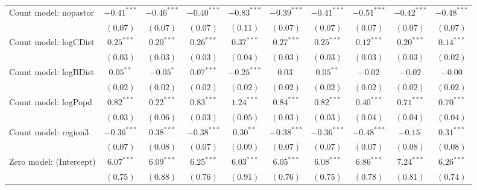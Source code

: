 \begin{sidewaystable}
\begin{center}
{\begin{tabular}{l c c c c c c c c c}
Count model: nopastor          & $-0.41^{***}$  & $-0.46^{***}$ & $-0.40^{***}$  & $-0.83^{***}$   & $-0.39^{***}$  & $-0.41^{***}$  & $-0.51^{***}$   & $-0.42^{***}$   & $-0.48^{***}$  \\
                               & $(0.07)$       & $(0.07)$      & $(0.07)$       & $(0.11)$        & $(0.07)$       & $(0.07)$       & $(0.07)$        & $(0.07)$        & $(0.07)$       \\
Count model: logCDist          & $0.25^{***}$   & $0.20^{***}$  & $0.26^{***}$   & $0.37^{***}$    & $0.27^{***}$   & $0.25^{***}$   & $0.12^{***}$    & $0.20^{***}$    & $0.14^{***}$   \\
                               & $(0.03)$       & $(0.03)$      & $(0.03)$       & $(0.04)$        & $(0.03)$       & $(0.03)$       & $(0.03)$        & $(0.03)$        & $(0.02)$       \\
Count model: logBDist          & $0.05^{**}$    & $-0.05^{*}$   & $0.07^{***}$   & $-0.25^{***}$   & $0.03^{\cdot}$ & $0.05^{**}$    & $-0.02$         & $-0.02$         & $-0.00$        \\
                               & $(0.02)$       & $(0.02)$      & $(0.02)$       & $(0.02)$        & $(0.02)$       & $(0.02)$       & $(0.02)$        & $(0.02)$        & $(0.02)$       \\
Count model: logPopd           & $0.82^{***}$   & $0.22^{***}$  & $0.83^{***}$   & $1.24^{***}$    & $0.84^{***}$   & $0.82^{***}$   & $0.40^{***}$    & $0.71^{***}$    & $0.70^{***}$   \\
                               & $(0.03)$       & $(0.06)$      & $(0.03)$       & $(0.05)$        & $(0.03)$       & $(0.03)$       & $(0.04)$        & $(0.04)$        & $(0.04)$       \\
Count model: region3           & $-0.36^{***}$  & $0.38^{***}$  & $-0.38^{***}$  & $0.30^{**}$     & $-0.38^{***}$  & $-0.36^{***}$  & $-0.48^{***}$   & $-0.15^{\cdot}$ & $0.31^{***}$   \\
                               & $(0.07)$       & $(0.08)$      & $(0.07)$       & $(0.09)$        & $(0.07)$       & $(0.07)$       & $(0.07)$        & $(0.08)$        & $(0.08)$       \\
Zero model: (Intercept)        & $6.07^{***}$   & $6.09^{***}$  & $6.25^{***}$   & $6.03^{***}$    & $6.05^{***}$   & $6.08^{***}$   & $6.86^{***}$    & $7.24^{***}$    & $6.26^{***}$   \\
                               & $(0.75)$       & $(0.88)$      & $(0.76)$       & $(0.91)$        & $(0.76)$       & $(0.75)$       & $(0.78)$        & $(0.81)$        & $(0.74)$       \\

\end{tabular}}
\end{center}
\end{sidewaystable}
